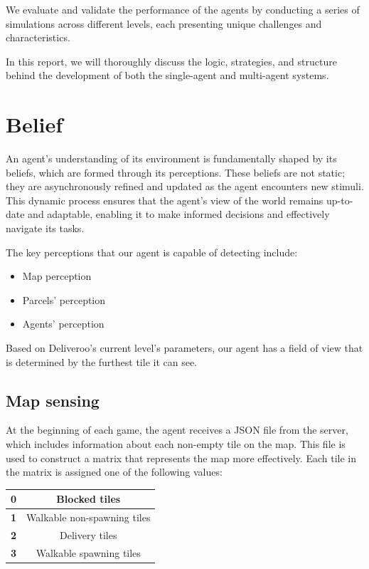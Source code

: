 \documentclass[10pt]{article}
\begin{document}
We evaluate and validate the performance of the agents by conducting a series of simulations across different levels, each presenting unique challenges and characteristics.

In this report, we will thoroughly discuss the logic, strategies, and structure behind the development of both the single-agent and multi-agent systems.


\section{Belief}
An agent’s understanding of its environment is fundamentally shaped by its beliefs, which are formed through its perceptions. These beliefs are not static; they are asynchronously refined and updated as the agent encounters new stimuli. This dynamic process ensures that the agent’s view of the world remains up-to-date and adaptable, enabling it to make informed decisions and effectively navigate its tasks.

The key perceptions that our agent is capable of detecting include:

\begin{itemize}
    \item Map perception
    \item Parcels' perception
    \item Agents' perception
\end{itemize}

Based on Deliveroo's current level's parameters, our agent has a field of view that is determined by the furthest tile it can see.

\subsection{Map sensing}

At the beginning of each game, the agent receives a JSON file from the server, which includes information about each non-empty tile on the map. This file is used to construct a matrix that represents the map more effectively. Each tile in the matrix is assigned one of the following values:

\begin{table}[h]
    \centering
    \begin{tabular}{|c|c|}
        \hline
        \textbf{0} & Blocked tiles \\
        \hline
        \textbf{1} & Walkable non-spawning tiles \\
        \hline
        \textbf{2} & Delivery tiles \\
        \hline
        \textbf{3} & Walkable spawning tiles \\
        \hline
    \end{tabular}
    \label{tab}
\end{table}
\end{document}
